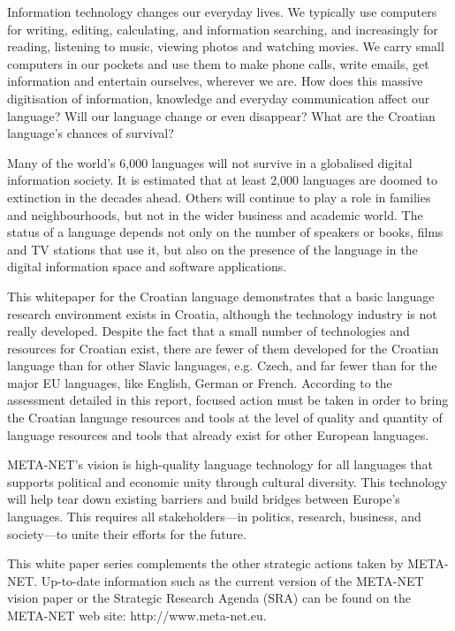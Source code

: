 \cleardoublepage



\begin{multicols}{2}

Information technology changes our everyday lives. We typically use computers for writing, editing, calculating, and information searching, and increasingly for reading, listening to music, viewing photos and watching movies. We carry small computers in our pockets and use them to make phone calls, write emails, get information and entertain ourselves, wherever we are. How does this massive digitisation of information, knowledge and everyday communication affect our language? Will our language change or even disappear? What are the Croatian language’s chances of survival? 

Many of the world’s 6,000 languages will not survive in a globalised digital information society. It is estimated that at least 2,000 languages are doomed to extinction in the decades ahead. Others will continue to play a role in families and neighbourhoods, but not in the wider business and academic world. The status of a language depends not only on the number of speakers or books, films and TV stations that use it, but also on the presence of the language in the digital information space and software applications. 

This whitepaper for the Croatian language demonstrates that a basic language research environment exists in Croatia, although the technology industry is not really developed. Despite the fact that a small number of technologies and resources for Croatian exist, there are fewer of them developed for the Croatian language than for other Slavic languages, e.g. Czech, and far fewer than for the major EU languages, like English, German or French. According to the assessment detailed in this report, focused action must be taken in order to bring the Croatian language resources and tools at the level of quality and quantity of language resources and tools that already exist for other European languages.

META-NET’s vision is high-quality language technology for all languages that supports political and economic unity through cultural diversity. This technology will help tear down existing barriers and build bridges between Europe’s languages. This requires all stakeholders—in politics, research, business, and society—to unite their efforts for the future.

This white paper series complements the other strategic actions taken by META-NET. Up-to-date information such as the current version of the META-NET vision paper \cite{str1} or the Strategic Research Agenda (SRA) can be found on the META-NET web site: http://www.meta-net.eu.

\end{multicols}
\clearpage

